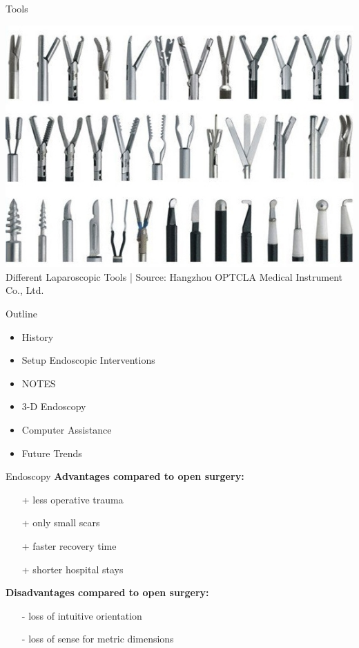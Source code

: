 \begin{frame}{Tools}

	\begin{center}
		\includegraphics[height=.8\textheight ]{images/tools}\\
		\scriptsize Different Laparoscopic Tools | Source: Hangzhou OPTCLA Medical Instrument Co., Ltd.
	\end{center}

\end{frame}



\begin{frame}{Outline}
	\begin{itemize}
		\item History
		\item Setup
		      \bolditem{} Endoscopic Interventions
		\item NOTES
		\item 3-D Endoscopy
		\item Computer Assistance
		\item Future Trends
	\end{itemize}
\end{frame}



\begin{frame}{Endoscopy}
	\textbf{Advantages compared to open surgery:}
	\begin{itemize}
		\item[+] less operative trauma
		\item[+] only small scars
		\item[+] faster recovery time
		\item[+] shorter hospital stays
	\end{itemize}
	\vspace{1em}
	\textbf{Disadvantages compared to open surgery:}
	\begin{itemize}
		\item[-] loss of intuitive orientation
		\item[-] loss of sense for metric dimensions
	\end{itemize}

\end{frame}



